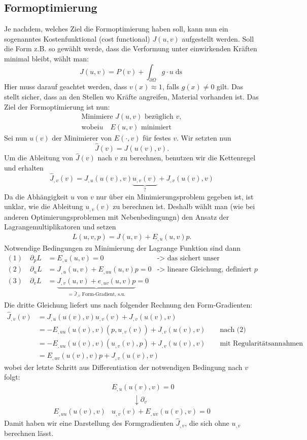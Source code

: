 \documentclass[a4paper, 12pt]{scrartcl}
\newcommand{\ds}{\mathop{ds}}
\newcommand{\Jhat}{\widehat{J}}
\begin{document}
\subsection{Formoptimierung}
Je nachdem, welches Ziel die Formoptimierung haben soll, kann nun ein sogenanntes Kostenfunktional (cost functional) $J(u,v)$ aufgestellt werden. Soll die Form z.B. so gewählt werde, dass die Verformung unter einwirkenden Kräften minimal bleibt, wählt man:
\[ J(u,v) = P(v) + \int_{\partial \Omega} g \cdot u \ds \]
Hier muss darauf geachtet werden, dass $v(x)\approx1$, falls $g(x) \neq 0$ gilt. Das stellt sicher, dass an den Stellen wo Kräfte angreifen, Material vorhanden ist. Das Ziel der Formoptimierung ist nun:
\begin{align*}
	\text{Minimiere } J(u,v) \text{ bezüglich } v, \\
	\text{wobei} u \quad E(u,v) \text{ minimiert}
\end{align*}
Sei nun $u(v)$ der Minimierer von $E(\cdot,v)$ für festes $v$. Wir setzten nun
\[ \Jhat(v) = J(u(v),v). \]
Um die Ableitung von $\Jhat(v)$ nach $v$ zu berechnen, benutzen wir die Kettenregel und erhalten
\[ \Jhat_{,v}(v) =  J_{,u}(u(v),v)\underbrace{u_{,v}(v)}_{?} + J_{,v} (u(v),v) \]
Da die Abhängigkeit $u$ von $v$ nur über ein Minimierungsproblem gegeben ist, ist unklar, wie die Ableitung $u_{,v}(v)$ zu berechnen ist. Deshalb wählt man (wie bei anderen Optimierungsproblemen mit Nebenbedingungn) den Ansatz der Lagrangemultiplikatoren und setzen
\begin{align*}
L(u,v,p) = J(u,v) + E_{,u}(u,v)p.
\end{align*}
Notwendige Bedingungen zu Minimierung der Lagrange Funktion sind dann
\begin{align*}
(1)\quad \partial_p L &= E_{,u}(u,v)=0 &\text{-> das sichert unser Nebenbedingung} \\
(2)\quad \partial_u L &= J_{,u}(u,v) + E_{,uu} (u,v)p = 0 &\text{-> lineare Gleichung, definiert }p \\
(3)\quad\partial_v L &= \underbrace{J_{,v}(u,v) + e_{,uv}(u,v)p}_{= \Jhat_{,v} \text{ Form-Gradient, s.u.}} = 0
\end{align*}
Die dritte Gleichung liefert uns nach folgender Rechnung den Form-Gradienten:
\begin{align*}
\Jhat_{,v}(v) &= J_{,u}(u(v),v)u_{,v}(v) + J_{,v}(u(v),v) \\
&=-E_{,uu}(u(v),v)(p,u_{,v}(v)) + J_{,v}(u(v),v) \qquad \text{nach (2)} \\
&=-E_{,uu}(u(v),v)(u_{,v}(v),p) + J_{,v}(u(v),v) \qquad \text{mit Regularitätsannahmen} \\
&=E_{,uv}(u(v),v)p +J_{,v} (u(v),v)
\end{align*}
wobei der letzte Schritt aus Differentiation der notwendigen Bedingung nach $v$ folgt:
\begin{align*}
&E_{,u}(u(v),v) = 0\\
&\qquad \quad \downarrow \partial_v \\
E_{,uu}(u(v),v) &u_{,v}(v) + E_{,uv}(u(v),v) = 0
\end{align*}
Damit haben wir eine Darstellung des Formgradienten $\Jhat_{,v}$, die sich ohne $u_{,v}$ berechnen lässt.
\end{document}
